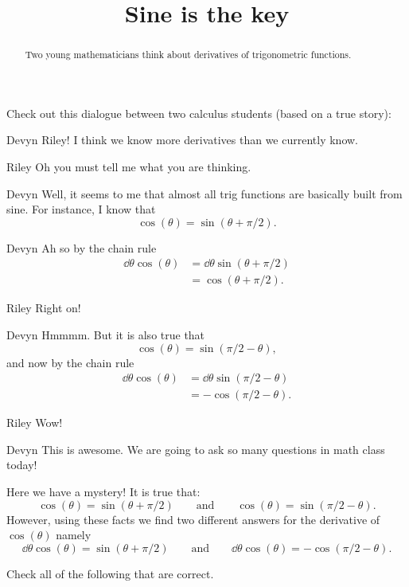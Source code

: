 \documentclass{ximera}
\title[Break-Ground:]{Sine is the key}
\begin{document}
\begin{abstract}
Two young mathematicians think about derivatives of trigonometric functions.
\end{abstract}
\maketitle

Check out this dialogue between two calculus students (based on a true
story):

\begin{dialogue}
\item[Devyn] Riley! I think we know more derivatives than we currently know.
\item[Riley] Oh you must tell me what you are thinking.
\item[Devyn] Well, it seems to me that almost all trig functions are
  basically built from sine. For instance, I know that 
  \[
  \cos(\theta)  = \sin(\theta + \pi/2).
  \]
\item[Devyn] Ah so by the chain rule
  \begin{align*}
  \dd{\theta}\cos(\theta) &= \dd{\theta} \sin(\theta + \pi/2)\\
  &=\cos(\theta + \pi/2).
  \end{align*}
\item[Riley] Right on!
\item[Devyn] Hmmmm. But it is also true that
  \[
  \cos(\theta) = \sin(\pi/2 - \theta), 
  \]
  and now by the chain rule
  \begin{align*}
  \dd{\theta}\cos(\theta) &= \dd{\theta}\sin(\pi/2-\theta)\\
  &=-\cos(\pi/2 - \theta).
  \end{align*}
\item[Riley] Wow!
\item[Devyn] This is awesome. We are going to ask so many questions in
  math class today!
\end{dialogue}

Here we have a mystery! It is true that:
\[
\cos(\theta)  = \sin(\theta + \pi/2) \qquad\text{and}\qquad\cos(\theta) = \sin(\pi/2 - \theta).
\]
However, using these facts we find two different answers for the derivative of $\cos(\theta)$ namely
\[
\dd{\theta} \cos(\theta) = \sin(\theta + \pi/2) \qquad\text{and}\qquad\dd{\theta}\cos(\theta) =-\cos(\pi/2 - \theta).
\]

\begin{problem}
  Check all of the following that are correct.
  \begin{multipleResponse}
  \end{multipleResponse}
\end{problem}


\end{document}
